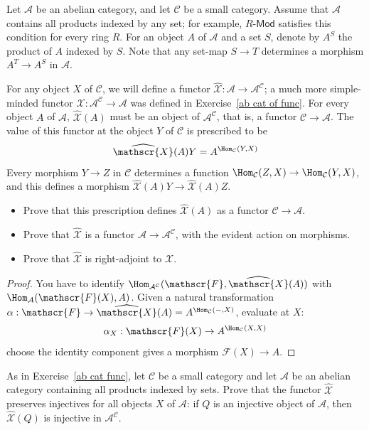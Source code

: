\begin{exercise}\label{ab cat func}
Let $\mathcal{A}$ be an abelian category, and let $\mathcal{C}$ be a small category. Assume that $\mathcal{A}$ contains all products indexed by any set; for example, $R$-$\mathsf{Mod}$ satisfies this
condition for every ring $R$. For an object $A$ of $\mathcal{A}$ and a set $S$, denote by $A^S$ the
product of $A$ indexed by $S$. Note that any set-map $S\to T$ determines a morphism $A^T\to A^S$ in $\mathcal{A}$.\par
For any object $X$ of $\mathcal{C}$, we will define a functor $\widehat{\mathscr{X}}:\mathcal{A}\to\mathcal{A}^\mathcal{C}$; a much more simple-minded functor $\mathscr{X}:\mathcal{A}^\mathcal{C}\to\mathcal{A}$ was defined in Exercise~\ref{ab cat of func}.
For every object $A$ of $\mathcal{A}$, $\widehat{\mathscr{X}}(A)$ must be an object of $\mathcal{A}^\mathcal{C}$, that is, a functor $\mathcal{C}\to\mathcal{A}$. The value of this functor at the object $Y$ of $\mathcal{C}$ is prescribed to be
\[\widehat{\mathscr{X}}(A)Y=A^{\Hom_{\mathcal{C}}(Y,X)}\]
Every morphism $Y\to Z$ in $\mathcal{C}$ determines a function $\Hom_{\mathcal{C}}(Z,X)\to\Hom_{\mathcal{C}}(Y,X)$, and this defines a morphism $\widehat{\mathscr{X}}(A)Y\to\widehat{\mathscr{X}}(A)Z$.
\begin{itemize}
\item Prove that this prescription defines $\widehat{\mathscr{X}}(A)$ as a functor $\mathcal{C}\to\mathcal{A}$.
\item Prove that $\widehat{\mathscr{X}}$ is a functor $\mathcal{A}\to\mathcal{A}^\mathcal{C}$, with the evident action on morphisms.
\item Prove that $\widehat{\mathscr{X}}$ is right-adjoint to $\mathscr{X}$.
\end{itemize}
\end{exercise}
\begin{proof}
You have to identify $\Hom_{\mathcal{A}^{\mathcal{C}}}(\mathscr{F},\widehat{\mathscr{X}}(A))$ with $\Hom_{\mathcal{A}}(\mathscr{F}(X),A)$. Given a natural transformation $\alpha:\mathscr{F}\to\widehat{\mathscr{X}}(A)=A^{\Hom_{\mathcal{C}}(-,X)}$, evaluate at $X$:
\[\alpha_X:\mathscr{F}(X)\to A^{\Hom_{\mathcal{C}}(X,X)}\]
choose the identity component gives a morphism $\mathscr{F}(X)\to A$.
\end{proof}
\begin{exercise}
As in Exercise~\ref{ab cat func}, let $\mathcal{C}$ be a small category and let $\mathcal{A}$ be an abelian category containing all products indexed by sets. Prove that the functor $\widehat{\mathscr{X}}$ preserves injectives for all objects $X$ of $\mathcal{A}$: if $Q$ is an injective object of $\mathcal{A}$, then $\widehat{\mathscr{X}}(Q)$ is injective in $\mathcal{A}^\mathcal{C}$.
\end{exercise}

